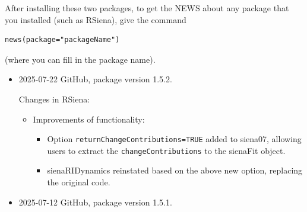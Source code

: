 \documentclass[a4paper,fleqn,11pt]{article}
\newcommand{\+}{\, + \,}
\newcommand{\sfn}[1]{\textsf{#1}}
\newcommand{\rs}{{\sf RSiena}}
\begin{document}
After installing these two packages,
to get the NEWS about any package that you installed
(such  as \rs), give the command
\begin{verbatim}
news(package="packageName")
\end{verbatim}
(where you can fill in the package name).
\bigskip

\begin{small}
\begin{itemize} %

\item 2025-07-22 GitHub, package version 1.5.2.

Changes in RSiena:
\begin{itemize}
\item Improvements of functionality:
   \begin{itemize}
    \item Option \texttt{returnChangeContributions=TRUE} added to \sfn{siena07}, allowing users to extract the \texttt{changeContributions} to the \sfn{sienaFit} object.
    \item \sfn{sienaRIDynamics} reinstated based on the above new option, replacing the original code.
    \end{itemize}
\end{itemize}


\item 2025-07-12 GitHub, package version 1.5.1.


\end{itemize}
\end{small}
\end{document}
